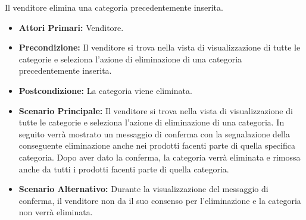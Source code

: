 
Il venditore elimina una categoria precedentemente inserita.
\begin{itemize}
    \item \textbf{Attori Primari:} Venditore.
    \item \textbf{Precondizione:} Il venditore si trova nella vista di visualizzazione di tutte le categorie e seleziona l'azione di eliminazione di una categoria precedentemente inserita.
    \item \textbf{Postcondizione:} La categoria viene eliminata.
    \item \textbf{Scenario Principale:} Il venditore si trova nella vista di visualizzazione di tutte le categorie e seleziona l'azione di eliminazione di una categoria. In seguito verrà mostrato un messaggio di conferma con la segnalazione della conseguente eliminazione anche nei prodotti facenti parte di quella specifica categoria. Dopo aver dato la conferma, la categoria verrà eliminata e rimossa anche da tutti i prodotti facenti parte di quella categoria.
    \item \textbf{Scenario Alternativo:} Durante la visualizzazione del messaggio di conferma, il venditore non da il suo consenso per l'eliminazione e la categoria non verrà eliminata.
\end{itemize}
